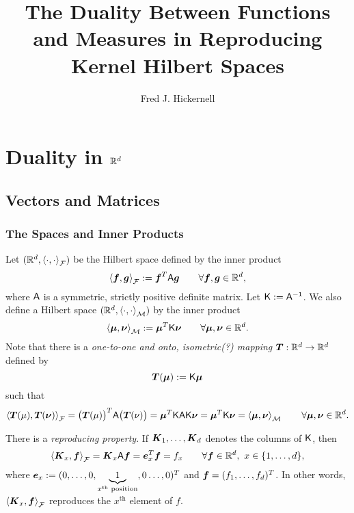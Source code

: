 \documentclass[reqno]{amsart}
\begin{document}
\title{The Duality Between Functions and Measures in Reproducing Kernel Hilbert Spaces}
\author{Fred J. Hickernell}


\maketitle

\section{Duality in $\reals^d$}

\subsection{Vectors and Matrices}

\subsubsection{The Spaces and Inner Products}

Let $(\reals^d,\ip[\cf]{\cdot}{\cdot})$ be the Hilbert space defined by the inner product 
\begin{equation*}
    \ip[\cf]{\vf}{\vg} := \vf^T \mA \vg \qquad \forall \vf, \vg \in \reals^d,
\end{equation*}
where $\mA$ is a symmetric, strictly positive definite matrix.  Let $\mK :=  \mA^{-1}$.  We also define a Hilbert space $(\reals^d,\ip[\cm]{\cdot}{\cdot})$ by the inner product
\begin{equation*}
    \ip[\cm]{\vmu}{\vnu} := \vmu^T \mK \vnu \qquad \forall \vmu, \vnu \in \reals^d.
\end{equation*}
Note that there is a \emph{one-to-one and onto, isometric(?) mapping} $\vT: \reals^d \to \reals^d$ defined by 
\[
\vT(\vmu) := \mK \vmu
\]
such that 
\begin{equation*}
    \ip[\cf]{\vT(\mu)}{\vT(\vnu)} = \bigl(\vT(\mu)\bigr)^T \mA \bigl(\vT(\nu)\bigr) = \vmu^T \mK \mA \mK \vnu = \vmu^T \mK \vnu = \ip[\cm]{\vmu}{\vnu} \qquad \forall \vmu, \vnu \in \reals^d.
\end{equation*}

There is a \emph{reproducing property}.  If $\vK_1, \ldots, \vK_d$ denotes the columns of $\mK$, then
\begin{equation*}
    \ip[\cf]{\vK_x}{\vf} = \vK_x \mA \vf = \ve_x^T \vf = f_x \qquad \forall \vf \in \reals^d, \ x \in \{1, \ldots, d\},
\end{equation*}
where $\ve_x := (0, \ldots, 0,\underbrace{1}_{x^{\text{th}} \text{ position}}, 0 \ldots, 0)^T$ and $\vf = (f_1, \ldots, f_d)^T$.  In other words, $ \ip[\cf]{\vK_x}{\vf}$ reproduces the $x^{\text{th}}$ element of $f$.
\end{document}
